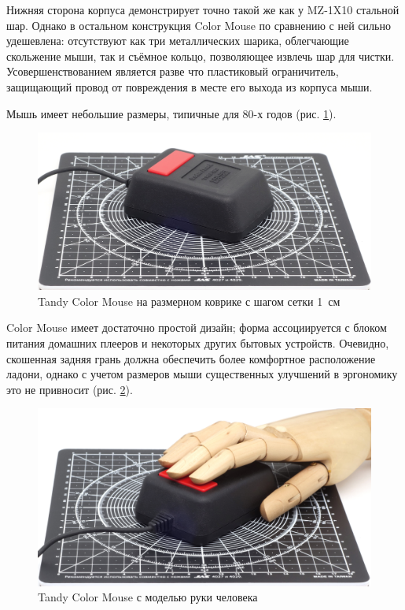 \documentclass[11pt, a4paper]{article}
\begin{document}
Нижняя сторона корпуса демонстрирует точно такой же как у MZ-1X10 стальной шар. Однако в остальном конструкция Color Mouse по сравнению с ней сильно удешевлена: отсутствуют как три металлических шарика, облегчающие скольжение мыши, так и съёмное кольцо, позволяющее извлечь шар для чистки. Усовершенствованием является разве что пластиковый ограничитель, защищающий провод от повреждения в месте его выхода из корпуса мыши.

Мышь имеет небольшие размеры, типичные для 80-х годов (рис. \ref{fig:TandyColorMouseSize}).

\begin{figure}[h]
    \centering
    \includegraphics[scale=0.49]{1984_tandy_trs80_color_mouse/size_30.jpg}
    \caption{Tandy Color Mouse на размерном коврике с шагом сетки 1~см}
    \label{fig:TandyColorMouseSize}
\end{figure}

Color Mouse имеет достаточно простой дизайн; форма ассоциируется с блоком питания домашних плееров и некоторых других бытовых устройств. Очевидно, скошенная задняя грань должна обеспечить более комфортное расположение ладони, однако с учетом размеров мыши существенных улучшений в эргономику это не привносит (рис. \ref{fig:TandyColorMouseHand}).

\begin{figure}[h]
    \centering
    \includegraphics[scale=0.55]{1984_tandy_trs80_color_mouse/hand_30.jpg}
    \caption{Tandy Color Mouse с моделью руки человека}
    \label{fig:TandyColorMouseHand}
\end{figure}
\end{document}
